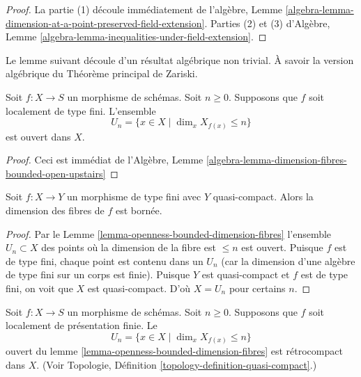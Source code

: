 \begin{proof}
La partie (1) découle
immédiatement
de l'algèbre, Lemme \ref{algebra-lemma-dimension-at-a-point-preserved-field-extension}.
Parties (2)
et (3) d'Algèbre, Lemme \ref{algebra-lemma-inequalities-under-field-extension}.
\end{proof}

\noindent
Le lemme suivant découle d’un résultat algébrique non trivial. À savoir
la version algébrique du Théorème principal de Zariski.

\begin{lemma}
\label{lemma-openness-bounded-dimension-fibres}
\begin{reference}
\cite[IV Théorème 13.1.3]{EGA}
\end{reference}
Soit $f : X \to S$ un morphisme de schémas. Soit $n \geq 0$.
Supposons que $f$ soit localement de type fini.
L'ensemble
$$
U_n = \{x \in X \mid \dim_x X_{f(x)} \leq n\}
$$
est ouvert dans $X$.
\end{lemma}

\begin{proof}
Ceci est immédiat
de
l'Algèbre, Lemme \ref{algebra-lemma-dimension-fibres-bounded-open-upstairs}
\end{proof}

\begin{lemma}
\label{lemma-morphism-finite-type-bounded-dimension}
Soit $f : X \to Y$ un morphisme de type fini avec $Y$ quasi-compact. Alors
la dimension des fibres de $f$ est bornée.
\end{lemma}

\begin{proof}
Par le Lemme \ref{lemma-openness-bounded-dimension-fibres} l'ensemble $U_n \subset X$ des points où
la dimension de la fibre est $\leq n$ est ouvert. Puisque $f$
est de type fini, chaque point est contenu dans un $U_n$ (car
la dimension d'une algèbre de type fini sur un corps est finie).
Puisque $Y$ est quasi-compact et $f$ est de type fini, on voit
que $X$ est quasi-compact. D'où $X = U_n$ pour certains
$n$.
\end{proof}

\begin{lemma}
\label{lemma-openness-bounded-dimension-fibres-finite-presentation}
Soit $f : X \to S$ un morphisme de schémas. Soit $n \geq 0$.
Supposons que $f$ soit localement de présentation finie.
Le
$$
U_n = \{x \in X \mid \dim_x X_{f(x)} \leq n\}
$$
ouvert du lemme \ref{lemma-openness-bounded-dimension-fibres} est rétrocompact dans $X$.
(Voir Topologie, Définition \ref{topology-definition-quasi-compact}.)
\end{lemma}

